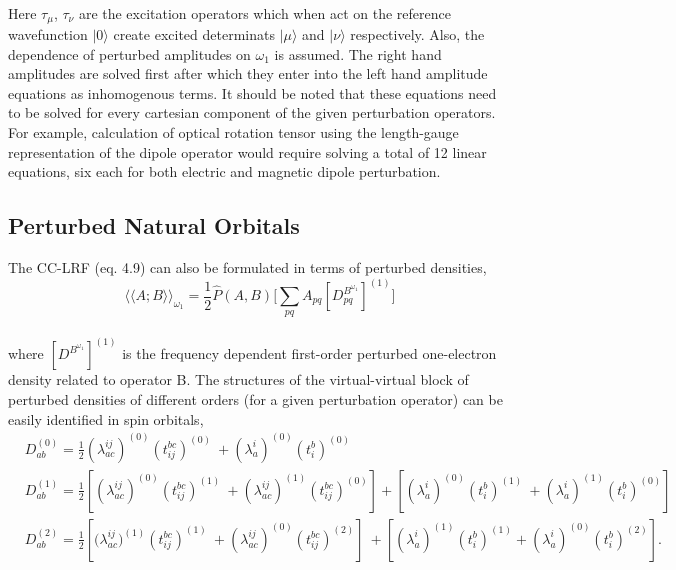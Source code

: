 \\
Here $\tau_\mu$, $\tau_\nu$ are the excitation operators which when act on the
reference wavefunction $|0\rangle$ create excited determinats $|\mu\rangle$ 
and $|\nu\rangle$ respectively. Also, the dependence of perturbed amplitudes
 on $\omega_1$ is assumed. The right hand amplitudes are solved first after 
which they enter into the left hand amplitude equations as inhomogenous terms. 
It should be noted that these equations need to be solved for every cartesian 
component of the given perturbation operators. For example, calculation of 
optical rotation tensor using the length-gauge representation of the dipole 
operator would require solving a total of 12 linear equations, six each 
for both electric and magnetic dipole perturbation.
\subsection{Perturbed Natural Orbitals}
The CC-LRF (eq. 4.9) can also be formulated in terms of perturbed densities,
\\
\begin{equation}
{\langle\langle A;B\rangle\rangle}_{\omega_1} =  \frac{1}{2}\hat{P}(A,B)\big[\sum_{pq} A_{pq}[{D^{B^{\omega_1}}_{pq}}]^{(1)}\big]
\end{equation}
\\
where $[{D^{B^{\omega_1}}}]^{(1)}$ is the frequency dependent first-order
perturbed one-electron density related to operator B. The structures  
of the virtual-virtual block of perturbed densities of different orders
(for a given perturbation operator) can be easily identified in spin orbitals,
\\
\begin{equation}
\begin{split}
& D^{(0)}_{ab} = \frac{1}{2}(\lambda^{ij}_{ac})^{(0)}(t^{bc}_{ij})^{(0)} \
+ (\lambda^{i}_{a})^{(0)}(t^{b}_{i})^{(0)} \\
&D^{(1)}_{ab} = \frac{1}{2}[(\lambda^{ij}_{ac})^{(0)}(t^{bc}_{ij})^{(1)} \
+ (\lambda^{ij}_{ac})^{(1)}(t^{bc}_{ij})^{(0)}] + [(\lambda^{i}_{a})^{(0)}(t^{b}_{i})^{(1)}\
 + (\lambda^{i}_{a})^{(1)}(t^{b}_{i})^{(0)}] \\
&D^{(2)}_{ab} = \frac{1}{2}[{(\lambda^{ij}_{ac}})^{(1)}(t^{bc}_{ij})^{(1)}\
 + (\lambda^{ij}_{ac})^{(0)}(t^{bc}_{ij})^{(2)}]\ 
+ [(\lambda^{i}_{a})^{(1)} (t^{b}_{i})^{(1)} + (\lambda^{i}_{a})^{(0)}(t^{b}_{i})^{(2)}].\\
\end{split}
\end{equation}
